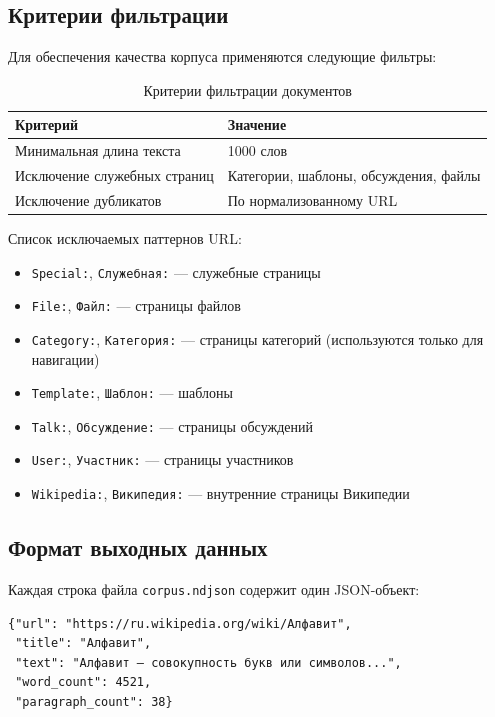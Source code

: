 \subsection{Критерии фильтрации}

Для обеспечения качества корпуса применяются следующие фильтры:

\begin{table}[H]
\centering
\begin{tabular}{ll}
\toprule
\textbf{Критерий} & \textbf{Значение} \\
\midrule
Минимальная длина текста & 1000 слов \\
Исключение служебных страниц & Категории, шаблоны, обсуждения, файлы \\
Исключение дубликатов & По нормализованному URL \\
\bottomrule
\end{tabular}
\caption{Критерии фильтрации документов}
\end{table}

Список исключаемых паттернов URL:
\begin{itemize}
    \item \texttt{Special:}, \texttt{Служебная:} --- служебные страницы
    \item \texttt{File:}, \texttt{Файл:} --- страницы файлов
    \item \texttt{Category:}, \texttt{Категория:} --- страницы категорий (используются только для навигации)
    \item \texttt{Template:}, \texttt{Шаблон:} --- шаблоны
    \item \texttt{Talk:}, \texttt{Обсуждение:} --- страницы обсуждений
    \item \texttt{User:}, \texttt{Участник:} --- страницы участников
    \item \texttt{Wikipedia:}, \texttt{Википедия:} --- внутренние страницы Википедии
\end{itemize}

\subsection{Формат выходных данных}

Каждая строка файла \texttt{corpus.ndjson} содержит один JSON-объект:

\begin{verbatim}
{"url": "https://ru.wikipedia.org/wiki/Алфавит",
 "title": "Алфавит",
 "text": "Алфавит — совокупность букв или символов...",
 "word_count": 4521,
 "paragraph_count": 38}
\end{verbatim}

